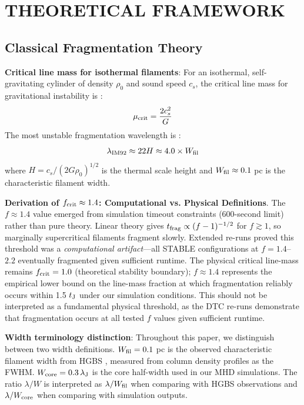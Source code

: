 \documentclass[twocolumn,usenatbib]{mnras}
\begin{document}
\section{THEORETICAL FRAMEWORK}

\subsection{Classical Fragmentation Theory}

\textbf{Critical line mass for isothermal filaments}: For an isothermal, self-gravitating cylinder of density $\rho_0$ and sound speed $c_s$, the critical line mass for gravitational instability is \citep{Ostriker1964}:
\begin{equation}
\mu_{\rm crit} = \frac{2c_s^2}{G}
\end{equation}
The most unstable fragmentation wavelength is \citep{Inutsuka1992}:
\begin{equation}
\lambda_{\rm IM92} \approx 22 H \approx 4.0 \times W_{\rm fil}
\label{eq:im92}
\end{equation}
where $H = c_s/(2G\rho_0)^{1/2}$ is the thermal scale height and $W_{\rm fil} \approx 0.1$ pc is the characteristic filament width.

\textbf{Derivation of $f_{\rm crit} \approx 1.4$: Computational vs. Physical Definitions}. The $f \approx 1.4$ value emerged from simulation timeout constraints (600-second limit) rather than pure theory. Linear theory gives $t_{\rm frag} \propto (f - 1)^{-1/2}$ for $f \gtrsim 1$, so marginally supercritical filaments fragment slowly. Extended re-runs proved this threshold was a \textit{computational artifact}---all STABLE configurations at $f = 1.4$--$2.2$ eventually fragmented given sufficient runtime. The physical critical line-mass remains $f_{\rm crit} = 1.0$ (theoretical stability boundary); $f \approx 1.4$ represents the empirical lower bound on the line-mass fraction at which fragmentation reliably occurs within 1.5 $t_{\rm J}$ under our simulation conditions. This should not be interpreted as a fundamental physical threshold, as the DTC re-runs demonstrate that fragmentation occurs at all tested $f$ values given sufficient runtime.

\textbf{Width terminology distinction}: Throughout this paper, we distinguish between two width definitions. $W_{\rm fil} = 0.1$ pc is the observed characteristic filament width from HGBS \citep{Arzoumanian2011}, measured from column density profiles as the FWHM. $W_{\rm core} = 0.3\,\lambda_{\rm J}$ is the core half-width used in our MHD simulations. The ratio $\lambda/W$ is interpreted as $\lambda/W_{\rm fil}$ when comparing with HGBS observations and $\lambda/W_{\rm core}$ when comparing with simulation outputs.
\end{document}
